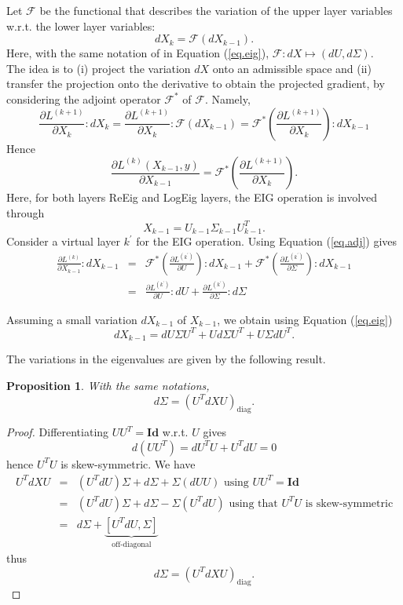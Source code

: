 \documentclass[10pt,a4paper]{book}
\theoremstyle{definition}
\theoremstyle{plain}
\newtheorem{prop}{Proposition}[section]
\theoremstyle{remark}
\newcommand{\Id}{\mathrm{\textbf{Id}}}
\begin{document}
Let $\mathcal{F}$ be the functional that describes the variation of the upper layer variables w.r.t. the lower layer variables:
$$dX_k=\mathcal{F}(dX_{k-1}).$$
Here, with the same notation of in Equation (\ref{eq.eig}), $\mathcal{F}: dX \mapsto (dU,d\Sigma)$.\\
The idea is to (i) project the variation $dX$ onto an admissible space and (ii) transfer the projection onto the derivative to obtain the projected gradient, by considering the adjoint operator $\mathcal{F}^{\ast}$ of $\mathcal{F}$. Namely,
\[
\frac{\partial L^{(k+1)}}{\partial X_k}: dX_k =\frac{\partial L^{(k+1)}}{\partial X_k}: \mathcal{F}(dX_{k-1})= \mathcal{F}^{\ast}\left(\frac{\partial L^{(k+1)}}{\partial X_k} \right) : dX_{k-1}
\]
Hence
\begin{equation} \label{eq.adj}
\frac{\partial L^{(k)}(X_{k-1},y)}{\partial X_{k-1}}=\mathcal{F}^{\ast}\left(\frac{\partial L^{(k+1)}}{\partial X_k} \right).
\end{equation}
Here, for both layers ReEig and LogEig layers, the EIG operation is involved through
$$X_{k-1}=U_{k-1}\Sigma_{k-1}U_{k-1}^{T}.$$
Consider a virtual layer $k^{\prime}$ for the EIG operation. Using Equation (\ref{eq.adj}) gives
\begin{eqnarray}
\frac{\partial L^{(k)}}{\partial X_{k-1}}:dX_{k-1}&=&\mathcal{F}^{\ast}\left(\frac{\partial L^{(k^{\prime})}}{\partial U} \right): dX_{k-1}+\mathcal{F}^{\ast}\left(\frac{\partial L^{(k^{\prime})}}{\partial \Sigma} \right):dX_{k-1}\\
\label{eq.com.adj}
&=&\frac{\partial L^{(k^{\prime})}}{\partial U}:dU+ \frac{\partial L^{(k^{\prime})}}{\partial \Sigma}:d\Sigma
\end{eqnarray}



Assuming a small variation $dX_{k-1}$ of $X_{k-1}$, we obtain using Equation (\ref{eq.eig})
$$
dX_{k-1}=dU\Sigma U^T+Ud\Sigma U^T+U\Sigma dU^T.
$$

The variations in the eigenvalues are given by the following result.
\begin{prop}
With the same notations,
$$d\Sigma=(U^T dX U)_{\text{diag}}.$$
\end{prop}
\begin{proof}
Differentiating $UU^T=\Id$ w.r.t. $U$ gives
$$d(UU^T)=dU^T U +U^T dU =0$$
hence $U^T U$ is skew-symmetric. 
We have 
\begin{eqnarray*}
    U^T dX U&=& (U^T dU)\Sigma +d\Sigma +\Sigma (dU U)\text{  using } UU^T = \Id\\
    &=& (U^T dU)\Sigma +d\Sigma -\Sigma(U^T dU) \text{  using that } U^TU \text{ is skew-symmetric}\\
    &=&d\Sigma+\underbrace{[U^TdU,\Sigma]}_{\text{off-diagonal}}
\end{eqnarray*}
thus
$$d\Sigma=(U^T dX U)_{\text{diag}}.$$
\end{proof}
\end{document}
